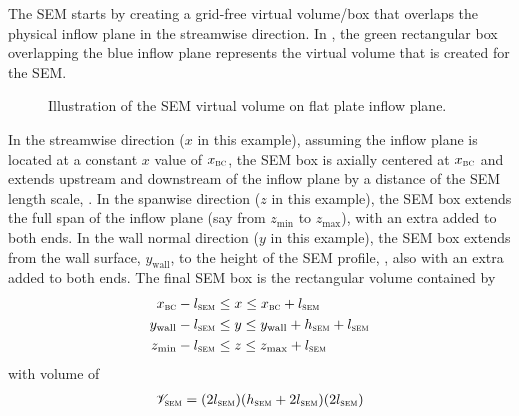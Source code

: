 The SEM starts by creating a grid-free virtual volume\slash box that overlaps
the physical inflow plane in the streamwise direction.
%
In , the green rectangular box overlapping the blue inflow
plane represents the virtual volume that is created for the SEM.
%
\begin{figure}[tb]
  \centering
  \caption{Illustration of the SEM virtual volume on flat plate inflow plane.}
  \label{FIG:SEM:box}
\end{figure}
%
In the streamwise direction ($x$ in this example), assuming the inflow plane is
located at a constant $x$ value of $x_{\textsc{bc}}$, the SEM box is axially
centered at $x_{\textsc{bc}}$ and extends upstream and downstream of the inflow
plane by a distance of the SEM length scale, \lSEM.
%
In the spanwise direction ($z$ in this example), the SEM box extends the full
span of the inflow plane (say from $z_{\textrm{min}}$ to $z_{\textrm{max}}$),
with an extra \lSEM{} added to both ends.
%
In the wall normal direction ($y$ in this example), the SEM box extends from the
wall surface, $y_{\textrm{wall}}$, to the height of the SEM profile, \hSEM, also
with an extra \lSEM{} added to both ends.
%
The final SEM box is the rectangular volume contained by 
%
\begin{gather}
  \begin{aligned}
    x_{\textsc{bc}}          - l_{\textsc{sem}} & \leq x \leq x_{\textsc{bc}}          + l_{\textsc{sem}} \\
    y_{\textrm{wall}} - l_{\textsc{sem}} & \leq y \leq y_{\textrm{wall}} + h_{\textsc{sem}}
                                                              + l_{\textsc{sem}} \\
    z_{\textrm{min}}  - l_{\textsc{sem}} & \leq z \leq z_{\textrm{max}}  + l_{\textsc{sem}}
  \end{aligned}
\end{gather}
%
with volume of
\begin{gather}
  \label{EQN:VolSEM}
  \mathscr{V}_{\textsc{sem}} = (2l_{\textsc{sem}})(h_{\textsc{sem}}+2l_{\textsc{sem}})(2l_{\textsc{sem}})
\end{gather}


\label{SEC:SEM:theory:DefineProfile}

